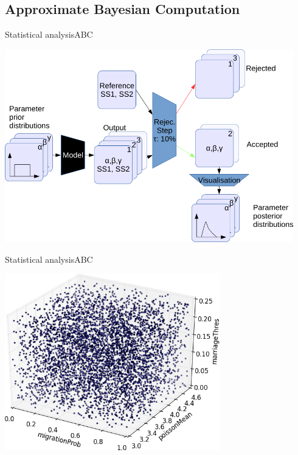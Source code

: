 \documentclass[10pt,aspectratio=43]{beamer}
\begin{document}
\subsection{Approximate Bayesian Computation}
\begin{frame}{Statistical analysis}{ABC}
\begin{center}
  \includegraphics[width=0.94\textwidth]{../data/abc-landscape.png}
\end{center}
\end{frame}

\begin{frame}{Statistical analysis}{ABC}
\begin{center}
  \includegraphics[width=0.7\textwidth]{../data/abc-space.png}
\end{center}
\end{frame}
\end{document}
